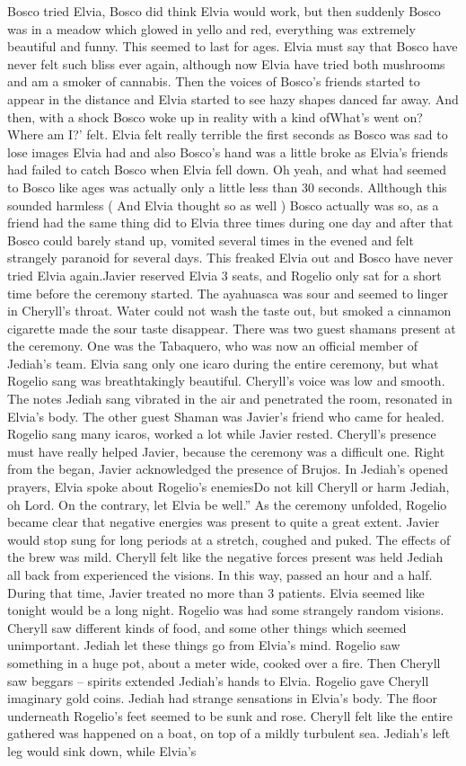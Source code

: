 \documentclass[12pt]{book}
\begin{document}
Bosco tried Elvia, Bosco did think Elvia would work, but then suddenly Bosco was in a meadow which glowed in yello and red, everything was extremely beautiful and funny. This seemed to last for ages. Elvia must say that Bosco have never felt such bliss ever again, although now Elvia have tried both mushrooms and am a smoker of cannabis. Then the voices of Bosco's friends started to appear in the distance and Elvia started to see hazy shapes danced far away. And then, with a shock Bosco woke up in reality with a kind ofWhat's went on? Where am I?' felt. Elvia felt really terrible the first seconds as Bosco was sad to lose images Elvia had and also Bosco's hand was a little broke as Elvia's friends had failed to catch Bosco when Elvia fell down. Oh yeah, and what had seemed to Bosco like ages was actually only a little less than 30 seconds. Allthough this sounded harmless ( And Elvia thought so as well ) Bosco actually was so, as a friend had the same thing did to Elvia three times during one day and after that Bosco could barely stand up, vomited several times in the evened and felt strangely paranoid for several days. This freaked Elvia out and Bosco have never tried Elvia again.Javier reserved Elvia 3 seats, and Rogelio only sat for a short time before the ceremony started. The ayahuasca was sour and seemed to linger in Cheryll's throat. Water could not wash the taste out, but smoked a cinnamon cigarette made the sour taste disappear. There was two guest shamans present at the ceremony. One was the Tabaquero, who was now an official member of Jediah's team. Elvia sang only one icaro during the entire ceremony, but what Rogelio sang was breathtakingly beautiful. Cheryll's voice was low and smooth. The notes Jediah sang vibrated in the air and penetrated the room, resonated in Elvia's body. The other guest Shaman was Javier's friend who came for healed. Rogelio sang many icaros, worked a lot while Javier rested. Cheryll's presence must have really helped Javier, because the ceremony was a difficult one. Right from the began, Javier acknowledged the presence of Brujos. In Jediah's opened prayers, Elvia spoke about Rogelio's enemiesDo not kill Cheryll or harm Jediah, oh Lord. On the contrary, let Elvia be well.'' As the ceremony unfolded, Rogelio became clear that negative energies was present to quite a great extent. Javier would stop sung for long periods at a stretch, coughed and puked. The effects of the brew was mild. Cheryll felt like the negative forces present was held Jediah all back from experienced the visions. In this way, passed an hour and a half. During that time, Javier treated no more than 3 patients. Elvia seemed like tonight would be a long night. Rogelio was had some strangely random visions. Cheryll saw different kinds of food, and some other things which seemed unimportant. Jediah let these things go from Elvia's mind. Rogelio saw something in a huge pot, about a meter wide, cooked over a fire. Then Cheryll saw beggars -- spirits extended Jediah's hands to Elvia. Rogelio gave Cheryll imaginary gold coins. Jediah had strange sensations in Elvia's body. The floor underneath Rogelio's feet seemed to be sunk and rose. Cheryll felt like the entire gathered was happened on a boat, on top of a mildly turbulent sea. Jediah's left leg would sink down, while Elvia's 
\end{document}
